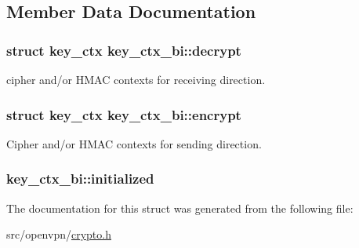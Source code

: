 \subsection{Member Data Documentation}
\hypertarget{structkey__ctx__bi_a552f7a501cae9ddf3a107d87a1b039fa}{}
\subsubsection[{decrypt}]{\setlength{\rightskip}{0pt plus 5cm}struct {\bf key\+\_\+ctx} key\+\_\+ctx\+\_\+bi\+::decrypt}\label{structkey__ctx__bi_a552f7a501cae9ddf3a107d87a1b039fa}
cipher and/or H\+M\+A\+C contexts for receiving direction. \hypertarget{structkey__ctx__bi_a7ef99b43dc7528037f1c81685d24a4d6}{}
\subsubsection[{encrypt}]{\setlength{\rightskip}{0pt plus 5cm}struct {\bf key\+\_\+ctx} key\+\_\+ctx\+\_\+bi\+::encrypt}\label{structkey__ctx__bi_a7ef99b43dc7528037f1c81685d24a4d6}
Cipher and/or H\+M\+A\+C contexts for sending direction. \hypertarget{structkey__ctx__bi_a2d1c4992f06672c3474722a569fb23b8}{}
\subsubsection[{initialized}]{ key\+\_\+ctx\+\_\+bi\+::initialized}\label{structkey__ctx__bi_a2d1c4992f06672c3474722a569fb23b8}


The documentation for this struct was generated from the following file\+:\begin{DoxyCompactItemize}
\item 
src/openvpn/\hyperlink{crypto_8h}{crypto.\+h}\end{DoxyCompactItemize}
